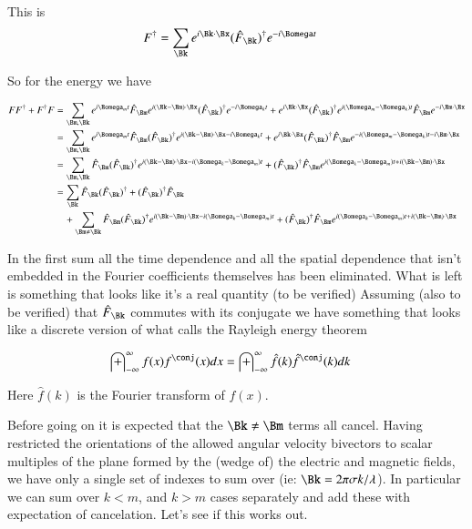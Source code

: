 \documentclass{article}
\newcommand{\IIinf}[0]{ \int_{-\infty}^\infty }
\begin{document}
This is
\begin{align}\label{eqn:conjugateField}
F^\dagger 
&= \sum_{\Bk} 
e^{i \Bk \cdot \Bx}
(\hat{F}_{\Bk})^{\dagger}
e^{-i \Bomega t}
\end{align}

So for the energy we have

\begin{align*}
FF^\dagger + F^\dagger F
&= 
\sum_{\Bm, \Bk} 
e^{i \Bomega_m t}
\hat{F}_{\Bm}
e^{i (\Bk-\Bm) \cdot \Bx}
(\hat{F}_{\Bk})^{\dagger}
e^{-i \Bomega_k t}
+
e^{i \Bk \cdot \Bx}
(\hat{F}_{\Bk})^{\dagger}
e^{i (\Bomega_m-\Bomega_k) t}
\hat{F}_{\Bm}
e^{-i \Bm \cdot \Bx} 
\\
&= 
\sum_{\Bm, \Bk} 
e^{i \Bomega_m t}
\hat{F}_{\Bm}
(\hat{F}_{\Bk})^{\dagger}
e^{i (\Bk-\Bm) \cdot \Bx -i \Bomega_k t}
+
e^{i \Bk \cdot \Bx}
(\hat{F}_{\Bk})^{\dagger}
\hat{F}_{\Bm}
e^{-i (\Bomega_m-\Bomega_k) t -i \Bm \cdot \Bx}
\\
&= 
\sum_{\Bm, \Bk} 
\hat{F}_{\Bm}
(\hat{F}_{\Bk})^{\dagger}
e^{i (\Bk-\Bm) \cdot \Bx -i (\Bomega_k-\Bomega_m) t}
+
(\hat{F}_{\Bk})^{\dagger}
\hat{F}_{\Bm}
e^{i (\Bomega_k-\Bomega_m) t +i (\Bk -\Bm) \cdot \Bx}
\\
&= 
\sum_{\Bk} 
\hat{F}_{\Bk}
(\hat{F}_{\Bk})^{\dagger}
+
(\hat{F}_{\Bk})^{\dagger}
\hat{F}_{\Bk} \\
&\quad+ 
\sum_{\Bm \ne \Bk} 
\hat{F}_{\Bm}
(\hat{F}_{\Bk})^{\dagger}
e^{i (\Bk-\Bm) \cdot \Bx -i (\Bomega_k-\Bomega_m) t}
+
(\hat{F}_{\Bk})^{\dagger}
\hat{F}_{\Bm}
e^{i (\Bomega_k-\Bomega_m) t +i (\Bk -\Bm) \cdot \Bx}
\\
\end{align*}

In the first sum all the time dependence and all the spatial dependence 
that isn't embedded in the Fourier coefficients themselves has been eliminated.
What is left is something that looks like it's a real quantity (to be verified)
Assuming (also to be verified) that $\hat{F}_{\Bk}$ commutes with its conjugate
we have something that looks 
like a discrete version of what \cite{haykin1994cs} calls
the Rayleigh energy theorem

\begin{align*}
\IIinf f(x)f^\conj(x) dx &= \IIinf \hat{f}(k)\hat{f}^\conj(k) dk
\end{align*}

Here $\hat{f}(k)$ is the Fourier transform of $f(x)$.

Before going on it is expected that
the $\Bk \ne \Bm$ terms all cancel.
Having restricted the orientations of the allowed angular velocity bivectors to scalar multiples of the plane formed by the (wedge of) the electric
and magnetic fields, we have only a single set of indexes to sum over (ie: $\Bk = 2 \pi \sigma k/ \lambda$).
In particular we can sum over $k < m$, and $k > m$ cases separately and add these
with expectation of cancelation.  Let's see if this works out.
\end{document}
